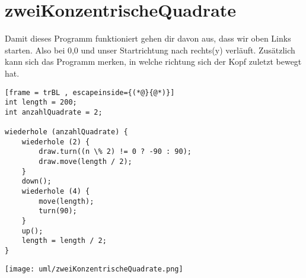 \section{zweiKonzentrischeQuadrate}
Damit dieses Programm funktioniert gehen dir davon aus, dass wir oben Links starten. Also bei 0,0 und unser Startrichtung nach rechts(y) verläuft. Zusätzlich kann sich das Programm merken, in welche richtung sich der Kopf zuletzt bewegt hat.

\begin{lstlisting}[frame = trBL , escapeinside={(*@}{@*)}]
int length = 200;
int anzahlQuadrate = 2;

wiederhole (anzahlQuadrate) {
	wiederhole (2) {
		draw.turn((n \% 2) != 0 ? -90 : 90);
		draw.move(length / 2);
	}
	down();
	wiederhole (4) {
		move(length);
		turn(90);
	}
	up();
	length = length / 2;
}
\end{lstlisting}

\texttt{[image: uml/zweiKonzentrischeQuadrate.png]}